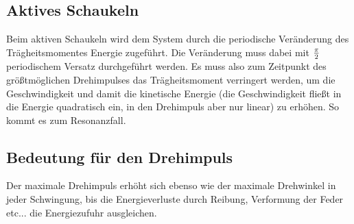 \subsection{Aktives Schaukeln}

Beim aktiven Schaukeln wird dem System durch die periodische Veränderung des Trägheitsmomentes Energie zugeführt.
Die Veränderung muss dabei mit $\pi \over 2$ periodischem Versatz durchgeführt werden.
Es muss also zum Zeitpunkt des größtmöglichen Drehimpulses das Trägheitsmoment verringert werden, um die Geschwindigkeit und damit die kinetische Energie (die Geschwindigkeit fließt in die Energie quadratisch ein, in den Drehimpuls aber nur linear) zu erhöhen.
So kommt es zum Resonanzfall.

\subsection{Bedeutung für den Drehimpuls}

Der maximale Drehimpuls erhöht sich ebenso wie der maximale Drehwinkel in jeder Schwingung, bis die Energieverluste durch Reibung, Verformung der Feder etc... die Energiezufuhr ausgleichen.
